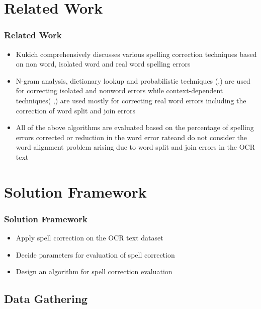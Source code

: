 \documentclass{beamer}
\begin{document}
\section{Related Work}
\begin{frame}
\frametitle{Related Work}
\begin{itemize}
 \justifying

\item
Kukich \cite{kukich1992techniques} comprehensively discusses various spelling correction techniques based on non word, isolated word and
real word spelling errors
\item
N-gram analysis, dictionary lookup and probabilistic techniques (\cite{agarwal2013utilizing},\cite{chattopadhyaya2013fast}) are used
for correcting isolated and nonword errors while context-dependent techniques( \cite{elmi1998spelling},\cite{bassil2012ocr}) are used mostly for correcting real
word errors including the correction of word split and join errors

\item
All of the above algorithms are evaluated based on the percentage of spelling errors corrected or reduction in the word error rate\cite{rice1996measuring}and do not consider the word
alignment problem arising due to word split and join errors in the OCR text
\end{itemize}
\end{frame}

 
\section{Solution Framework}
\begin{frame}

\frametitle{Solution Framework}
\begin{itemize}
\item
Apply spell correction on the OCR text dataset
\item
Decide parameters for evaluation of spell correction
\item
Design an algorithm for spell correction evaluation
\end{itemize}
\end{frame}

\subsection{Data Gathering}
\end{document}
